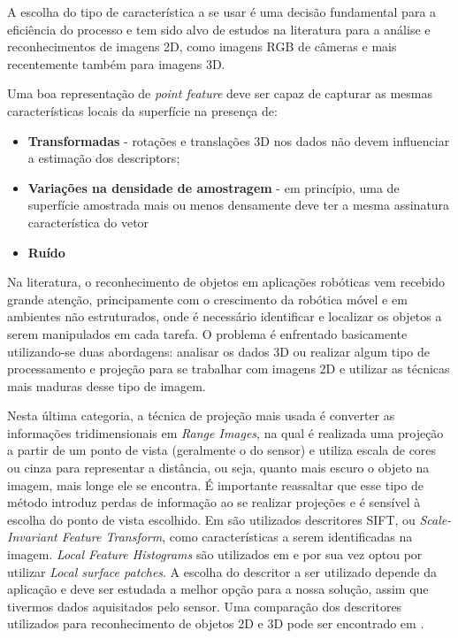 A escolha do tipo de característica a se usar é uma decisão fundamental para a
eficiência do processo e tem sido alvo de estudos na literatura para a análise
e reconhecimentos de imagens 2D, como imagens RGB de câmeras e mais recentemente
também para imagens 3D. 

Uma boa representação de \textit{point feature} deve ser capaz de capturar as
mesmas características locais da superfície na presença de:

\begin{itemize}
  \item \textbf{Transformadas} -  rotações e translações 3D nos dados não devem
  influenciar a estimação dos descriptors;
  \item \textbf{Variações na densidade de amostragem} - em princípio, uma de
  superfície amostrada mais ou menos densamente deve ter a mesma assinatura característica do vetor
  \item \textbf{Ruído}
\end{itemize}

Na literatura, o reconhecimento de objetos em aplicações robóticas vem recebido
grande atenção, principamente com o crescimento da robótica móvel e em ambientes
não estruturados, onde é necessário identificar e localizar os objetos a serem
manipulados em cada tarefa. O problema é enfrentado basicamente utilizando-se
duas abordagens: analisar os dados 3D ou realizar algum tipo de processamento e
projeção para se trabalhar com imagens 2D e utilizar as técnicas mais maduras
desse tipo de imagem.

Nesta última categoria, a técnica de projeção
mais usada é converter as informações tridimensionais em \textit{Range Images},
na qual é realizada uma projeção a partir de um ponto de vista (geralmente o do sensor) e utiliza escala
de cores ou cinza para representar a distância, ou seja, quanto mais escuro o
objeto na imagem, mais longe ele se encontra. É importante reassaltar que esse
tipo de método introduz perdas de informação ao se realizar projeções e é
sensível à escolha do ponto de vista escolhido. Em \cite{Bayramoglu2010} são
utilizados descritores SIFT, ou \textit{Scale-Invariant Feature Transform},  
como características a serem identificadas na imagem. \textit{Local Feature
Histograms} são utilizados em \cite{Hetzel2001} e por sua vez \cite{Chen2007}
optou por utilizar \textit{Local surface patches}. A escolha do descritor a ser
utilizado depende da aplicação e deve ser estudada a melhor opção para a nossa
solução, assim que tivermos dados aquisitados pelo sensor. Uma comparação dos
descritores utilizados para reconhecimento de objetos 2D e 3D pode ser
encontrado em \cite{Zaharia2004, Weber2014}.

